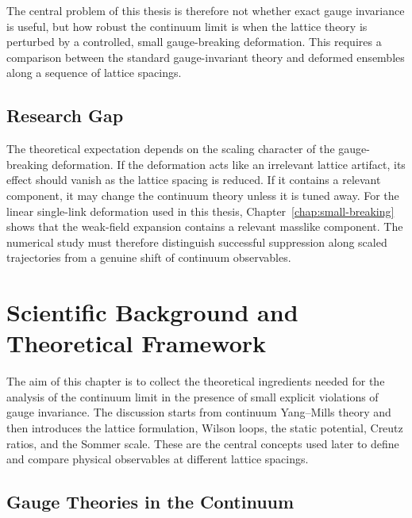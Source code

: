 \documentclass[12pt,a4paper,oneside,numbers=noenddot]{scrreprt}
\begin{document}
The central problem of this thesis is therefore not whether exact gauge
invariance is useful, but how robust the continuum limit is when the lattice
theory is perturbed by a controlled, small gauge-breaking deformation. This
requires a comparison between the standard gauge-invariant theory and deformed
ensembles along a sequence of lattice spacings.

\section{Research Gap}
The theoretical expectation depends on the scaling character of the
gauge-breaking deformation. If the deformation acts like an irrelevant lattice
artifact, its effect should vanish as the lattice spacing is reduced. If it
contains a relevant component, it may change the continuum theory unless it is
tuned away. For the linear single-link deformation used in this thesis,
Chapter~\ref{chap:small-breaking} shows that the weak-field expansion contains
a relevant masslike component. The numerical study must therefore distinguish
successful suppression along scaled trajectories from a genuine shift of
continuum observables.

\chapter{Scientific Background and Theoretical Framework}
\label{chap:theoretical-background}

The aim of this chapter is to collect the theoretical ingredients needed for the
analysis of the continuum limit in the presence of small explicit violations of
gauge invariance. The discussion starts from continuum Yang--Mills theory and
then introduces the lattice formulation, Wilson loops, the static potential,
Creutz ratios, and the Sommer scale. These are the central concepts used later
to define and compare physical observables at different lattice spacings.

\section{Gauge Theories in the Continuum}
\label{sec:continuum-gauge-theory}
\end{document}
